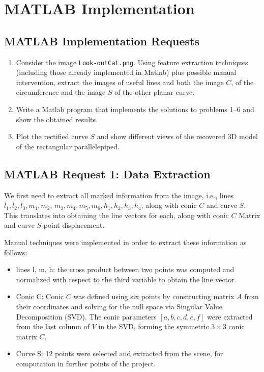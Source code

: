 \documentclass{Configuration_Files/PoliMi3i_thesis}
\begin{document}
\newpage
\chapter{MATLAB Implementation}

\section*{MATLAB Implementation Requests}
\begin{enumerate}
    \item Consider the image \texttt{Look-outCat.png}. Using feature extraction techniques (including those already implemented in Matlab) plus possible manual intervention, extract the images of useful lines and both the image \( C \), of the circumference and the image \( S \) of the other planar curve.
    \item Write a Matlab program that implements the solutions to problems 1–6 and show the obtained results.
    \item Plot the rectified curve \( S \) and show different views of the recovered 3D model of the rectangular parallelepiped.
\end{enumerate}

\newpage
\section{MATLAB Request 1: Data Extraction}

\noindent
We first need to extract all marked information from the image, i.e., lines \( l_1, l_2, l_3, m_1, m_2\),
\(m_3, m_4, m_5, m_6, h_1, h_2, h_3, h_4 \), along with conic \( C \) and curve \( S \).\\
This translates into obtaining the line vectors for each, along with conic \( C \) Matrix and curve \( S \) point displacement.

Manual techniques were implemented in order to extract these information as follows:
\begin{itemize}
    \item lines l, m, h: the cross product between two points was computed and normalized with respect to the third variable to obtain the line vector.
    \item Conic C: Conic $C$ was defined using six points by constructing matrix $A$ from their coordinates and solving for the null space via Singular Value Decomposition (SVD). The conic parameters $[a, b, c, d, e, f]$ were extracted from the last column of $V$ in the SVD, forming the symmetric $3 \times 3$ conic matrix $C$.
    \item Curve S: 12 points were selected and extracted from the scene, for computation in further points of the project.
\end{itemize}
\end{document}
